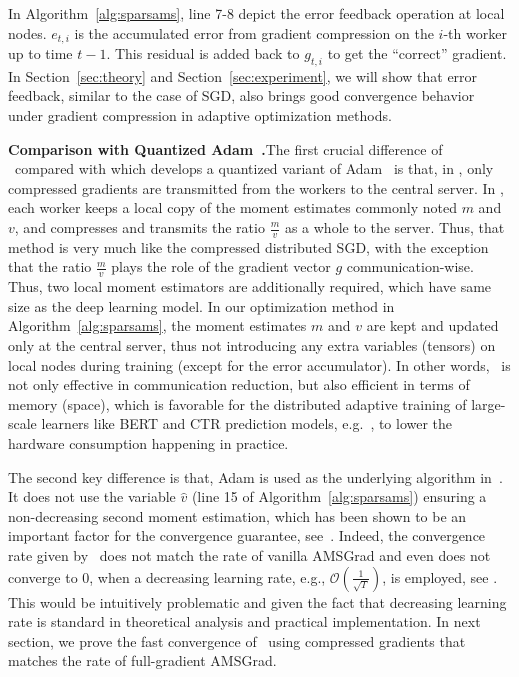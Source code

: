 \documentclass[11pt]{article}
\begin{document}
In Algorithm~\ref{alg:sparsams}, line 7-8 depict the error feedback operation at local nodes. $e_{t,i}$ is the accumulated error from gradient compression on the $i$-th worker up to time $t-1$. This residual is added back to $g_{t,i}$ to get the ``correct'' gradient. In Section~\ref{sec:theory} and Section~\ref{sec:experiment}, we will show that error feedback, similar to the case of SGD, also brings good convergence behavior under gradient compression in adaptive optimization methods.


\textbf{Comparison with Quantized Adam~\cite{chen2020quantized}.}\hspace{0.1in}The first crucial difference of \algo\ compared with \citep{chen2020quantized} which develops a quantized variant of Adam~\cite{kingma2014adam} is that, in \algo, only compressed gradients are transmitted from the workers to the central server. 
In \citep{chen2020quantized}, each worker keeps a local copy of the moment estimates commonly noted $m$ and $v$, and compresses and transmits the ratio $\frac{m}{v}$ as a whole to the server. 
Thus, that method is very much like the compressed distributed SGD, with the exception that the ratio $\frac{m}{v}$ plays the role of the gradient vector $g$ communication-wise. Thus, two local moment estimators are additionally required, which have same size as the deep learning model.
In our optimization method in Algorithm~\ref{alg:sparsams}, the moment estimates $m$ and $v$ are kept and updated only at the central server, thus not introducing any extra variables (tensors) on local nodes during training (except for the error accumulator). In other words, \algo\ is not only effective in communication reduction, but also efficient in terms of memory (space), which is favorable for the distributed adaptive training of large-scale learners like BERT and CTR prediction models, e.g.~\cite{Proc:BERT,Proc:Zhao_MLsys20}, to lower the hardware consumption happening in practice.

The second key difference is that, Adam is used as the underlying algorithm in~\cite{chen2020quantized}. 
It does not use the variable $\hat v$ (line 15 of Algorithm~\ref{alg:sparsams}) ensuring a non-decreasing second moment estimation, which has been shown to be an important factor for the convergence guarantee, see~\cite{reddi2019convergence,Proc:Chen_ICLR19}. 
Indeed, the convergence rate given by~\cite{chen2020quantized} does not match the rate of vanilla AMSGrad and even does not converge to $0$, when a decreasing learning rate, e.g., $\mathcal O(\frac{1}{\sqrt T})$, is employed, see \cite[Th.~1]{chen2020quantized}.
This would be intuitively problematic and given the fact that decreasing learning rate is standard in theoretical analysis and practical implementation. 
In next section, we prove the fast convergence of \algo\ using compressed gradients that matches the rate of full-gradient AMSGrad.
\end{document}
